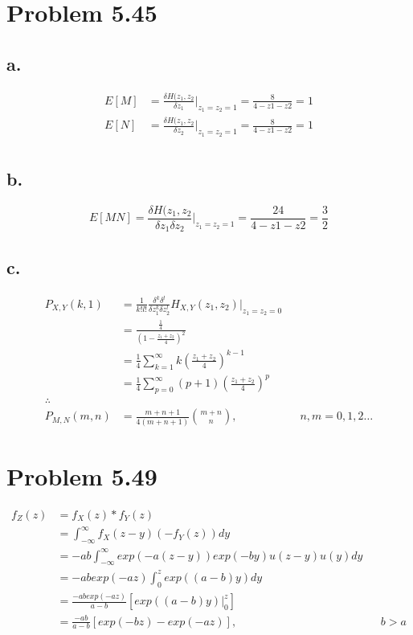 \documentclass[12pt]{article}
\begin{document}
\section{Problem 5.45}
\subsection{a.}
\begin{align*}
  E[M] &= \frac{\delta H(z_1,z_2}{\delta z_1}\big|_{z_1 = z_2 = 1} = \frac{8}{4-z1-z2} = 1 \\
  E[N] &= \frac{\delta H(z_1,z_2}{\delta z_2}\big|_{z_1 = z_2 = 1} = \frac{8}{4-z1-z2} = 1 \\
\end{align*}

\subsection{b.}
\[
E[MN] = \frac{\delta H(z_1,z_2}{\delta z_1 \delta z_2}\big|_{z_1 = z_2 = 1} = \frac{24}{4-z1-z2} = \frac{3}{2}
\]

\subsection{c.}
\begin{align*}
  P_{X,Y}(k,1) &= \frac{1}{k!l!} \frac{\delta^k \delta^l}{\delta z_1^k \delta z_2^l} H_{X,Y}(z_1,z_2)\big|_{z_1=z_2=0} \\
  &= \frac{\frac{1}{4}}{(1-\frac{z_1+z_2}{4})^2} \\
  &= \frac{1}{4} \sum_{k=1}^\infty k \left(\frac{z_1+z_2}{4}\right)^{k-1} \\
  &= \frac{1}{4} \sum_{p=0}^\infty (p+1) \left(\frac{z_1+z_2}{4}\right)^p \\
  \therefore \\
  P_{M,N}(m,n) &= \frac{m+n+1}{4(m+n+1)} \binom{m+n}{n}, & & n,m = 0 , 1 , 2 \dots
\end{align*}

\section{Problem 5.49}
\begin{align*}
f_Z(z) &= f_X(z) * f_Y(z) \\
&= \int_{-\infty}^\infty f_X(z-y)(-f_Y(z))dy \\
&= -ab\int_{-\infty}^\infty exp(-a(z-y))exp(-by)u(z-y)u(y)dy \\
&= -abexp(-az)\int_{0}^z exp((a-b)y)dy \\
&= \frac{-abexp(-az)}{a-b}\left[ exp((a-b)y)\big|_0^z \right] \\
&= \frac{-ab}{a-b}\left[ exp(-bz)-exp(-az) \right], & & b>a
\end{align*}
\end{document}
